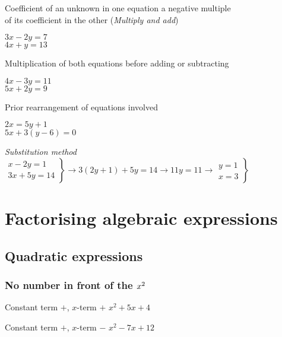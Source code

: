 \documentclass{article}
\begin{document}
Coefficient of an unknown in one equation a negative multiple \\
of its coefficient in the other (\textit{Multiply and add})
\vspace{-1.2cm}
\begin{flushright}
\(3x - 2y = 7\) \\
\(4x + y = 13\)
\end{flushright}

Multiplication of both equations before adding or subtracting
\vspace{-1.3cm}
\begin{flushright}
\(4x - 3y = 11\) \\
\(5x + 2y = 9\)
\end{flushright}

Prior rearrangement of equations involved
\vspace{-1.3cm}
\begin{flushright}
\(2x = 5y + 1\) \\
\(5x + 3(y-6) = 0\)
\end{flushright}

\textit{Substitution method}
\hfill
\( \left.
\begin{array}{l}
x - 2y = 1 \\
3x + 5y = 14
\end{array}
\right\} \rightarrow 3(2y+1) + 5y = 14 \rightarrow 11y = 11 \rightarrow
\left.
\begin{array}{l}
y = 1 \\
x = 3
\end{array}
\right\}
\)

\section{Factorising algebraic expressions}

\subsection{Quadratic expressions}

\subsubsection{No number in front of the \protect\(x^2\protect\)}

Constant term \(+\), \(x\)-term \(+\) \hfill \(x^2 + 5x +4\)

Constant term \(+\), \(x\)-term \(-\) \hfill \(x^2 - 7x +12\)
\end{document}
